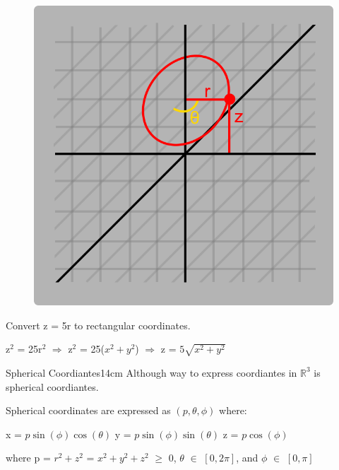     \begin{figure}[h]
        \centering
        \includegraphics[scale=0.3]{Images/1.6.2.png}
    \end{figure}



    \begin{example}
        Convert z = 5r to rectangular coordinates.
    \end{example}

    \begin{tbox}
        z$^2$ = 25r$^2$
        \hspace{1cm}
        $\Rightarrow$
        \hspace{1cm}
        z$^2$ = 25($x^2+y^2$)
        \hspace{1cm}
        $\Rightarrow$
        \hspace{1cm}
        z = $5\sqrt{x^2+y^2}$
    \end{tbox}

    \vspace{0.5cm}



    \begin{definition}{Spherical Coordiantes}{14cm}
        Although way to express coordiantes in $\mathbb{R}^3$ is spherical
        coordiantes.

        {\color{lblue} Spherical coordinates} are expressed as
        $(p,\theta,\phi)$ where:

        \hspace{0.5cm}
        x = $p \sin(\phi) \cos(\theta)$
        \hspace{1cm}
        y = $p \sin(\phi) \sin(\theta)$
        \hspace{1cm}
        z = $p \cos(\phi)$

        where p = $r^2 + z^2$ = $x^2 + y^2 + z^2$ $\geq$ 0,
        $\theta$ $\in$ $[0,2\pi]$, and $\phi$ $\in$ $[0,\pi]$
    \end{definition}

